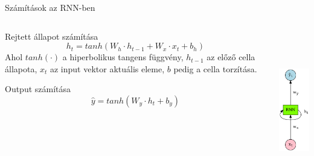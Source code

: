 \documentclass[english, aspectratio=169]{beamer}
\begin{document}
\begin{frame}{Számítások az RNN-ben}
\begin{columns}
\begin{column}{.5\textwidth}
\begin{block}{Rejtett állapot számítása}
\[
h_t = tanh\left(W_h \cdot h_{t-1} + W_x \cdot x_t + b_h\right)
\]
Ahol $tanh(\cdot)$ a hiperbolikus tangens függvény, $h_{t-1}$ az előző cella állapota, $x_t$ az input vektor aktuális eleme, $b$ pedig a cella torzítása.
\end{block}
\begin{block}{Output számítása}
\[
\hat{y} = tanh\left(W_y \cdot h_t + b_y\right)
\]
\end{block}
\end{column}
\begin{column}{.5\textwidth}
\begin{center}
\includegraphics[height=7cm, keepaspectratio]{graphs/recurrent_8.png}
\end{center}
\end{column}
\end{columns}
\end{frame}
\end{document}
